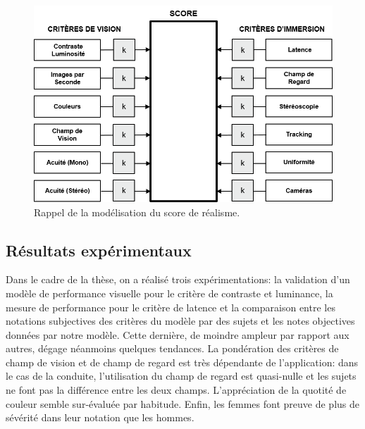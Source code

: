 	\begin{figure}
		\renewcommand\thefigure{I}
		\centering
		\includegraphics[scale=1]{Figures/ScoreRealismeMini}
		\caption{Rappel de la modélisation du score de réalisme.}
		\label{fig:score_realisme_mini}
	\end{figure}
	
	\subsection*{Résultats expérimentaux}
	\par Dans le cadre de la thèse, on a réalisé trois expérimentations: la validation d'un modèle de performance visuelle pour le critère de contraste et luminance, la mesure de performance pour le critère de latence et la comparaison entre les notations subjectives des critères du modèle par des sujets et les notes objectives données par notre modèle. Cette dernière, de moindre ampleur par rapport aux autres, dégage néanmoins quelques tendances. La pondération des critères de champ de vision et de champ de regard est très dépendante de l'application: dans le cas de la conduite, l'utilisation du champ de regard est quasi-nulle et les sujets ne font pas la différence entre les deux champs. L'appréciation de la quotité de couleur semble sur-évaluée par habitude. Enfin, les femmes font preuve de plus de sévérité dans leur notation que les hommes.
	
